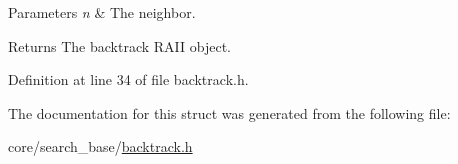 \begin{DoxyParams}{Parameters}
{\em n} & The neighbor. \\
\hline
\end{DoxyParams}
\begin{DoxyReturn}{Returns}
The backtrack R\+A\+II object. 
\end{DoxyReturn}


Definition at line 34 of file backtrack.\+h.



The documentation for this struct was generated from the following file\+:\begin{DoxyCompactItemize}
\item 
core/search\+\_\+base/\hyperlink{backtrack_8h}{backtrack.\+h}\end{DoxyCompactItemize}

